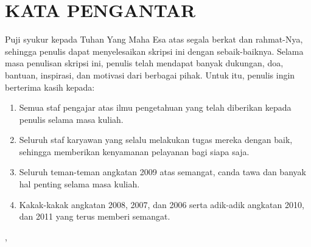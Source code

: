 \chapter*{\normalsize KATA PENGANTAR}

Puji syukur kepada Tuhan Yang Maha Esa atas segala berkat dan rahmat-Nya, sehingga penulis dapat menyelesaikan skripsi ini dengan sebaik-baiknya. Selama masa penulisan skripsi ini, penulis telah mendapat banyak dukungan, doa, bantuan, inspirasi, dan motivasi dari berbagai pihak. Untuk itu, penulis ingin berterima kasih kepada:
\begin{enumerate}
	\item Semua staf pengajar atas ilmu pengetahuan yang telah diberikan kepada penulis selama masa kuliah.
	\item Seluruh staf karyawan yang selalu melakukan tugas mereka dengan baik, sehingga memberikan kenyamanan pelayanan bagi siapa saja.
	\item Seluruh teman-teman angkatan 2009 atas semangat, canda tawa dan banyak hal penting selama masa kuliah.
	\item Kakak-kakak angkatan 2008, 2007, dan 2006 serta adik-adik angkatan 2010, dan 2011 yang terus memberi semangat.
\end{enumerate}


\vspace*{0.5cm}

\begin{flushleft}
\kota, \tanggalPengesahan\\ %
\penulis %
\end{flushleft} 